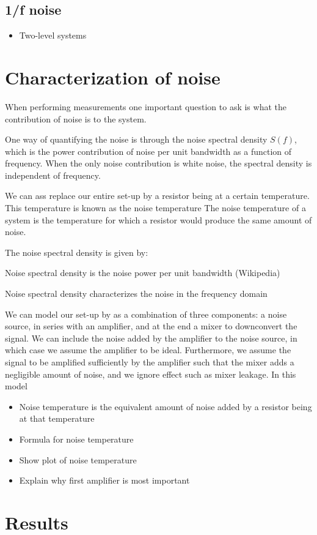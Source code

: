 \documentclass[12pt]{report}
\begin{document}
\subsection{1/f noise}
\begin{itemize}
    \item Two-level systems
\end{itemize}


\section{Characterization of noise}

When performing measurements one important question to ask is what the contribution of noise is to the system.

One way of quantifying the noise is through the noise spectral density $S(f)$, which is the power contribution of noise per unit bandwidth as a function of frequency. When the only noise contribution is white noise, the spectral density is independent of frequency.

We can ass
replace our entire set-up by a resistor being at a certain temperature. This temperature is known as the noise temperature
The noise temperature of a system is the temperature for which a resistor would produce the same amount of noise.

The noise spectral density is given by:




Noise spectral density is the noise power per unit bandwidth (Wikipedia)

Noise spectral density characterizes the noise in the frequency domain


We can model our set-up by as a combination of three components: a noise source, in series with an amplifier, and at the end a mixer to downconvert the signal. We can include the noise added by the amplifier to the noise source, in which case we assume the amplifier to be ideal. Furthermore, we assume the signal to be amplified sufficiently by the amplifier such that the mixer adds a negligible amount of noise, and we ignore effect such as mixer leakage. In this model

\begin{itemize}
    \item Noise temperature is the equivalent amount of noise added by a resistor being at that temperature
    \item Formula for noise temperature
    \item Show plot of noise temperature
    \item Explain why first amplifier is most important
\end{itemize}



\section{Results}
\label{sec:noise_results}








\end{document}
